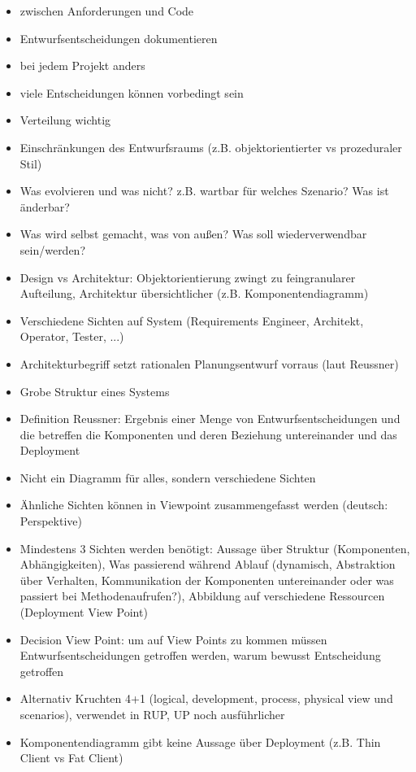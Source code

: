 \documentclass[paper=a4, fontsize=11pt]{scrartcl} %
\numberwithin{equation}{section} %
\numberwithin{figure}{section} %
\numberwithin{table}{section} %
\begin{document}
\begin{itemize}
  \item zwischen Anforderungen und Code
  \item Entwurfsentscheidungen dokumentieren
  \item bei jedem Projekt anders
  \item viele Entscheidungen können vorbedingt sein
  \item Verteilung wichtig
  \item Einschränkungen des Entwurfsraums (z.B. objektorientierter vs prozeduraler Stil)
  \item Was evolvieren und was nicht? z.B. wartbar für welches Szenario? Was ist änderbar?
  \item Was wird selbst gemacht, was von außen? Was soll wiederverwendbar sein/werden?
  \item Design vs Architektur: Objektorientierung zwingt zu feingranularer Aufteilung, Architektur übersichtlicher (z.B. Komponentendiagramm)
  \item Verschiedene Sichten auf System (Requirements Engineer, Architekt, Operator, Tester, ...)
  \item Architekturbegriff setzt rationalen Planungsentwurf vorraus (laut Reussner)
  \item Grobe Struktur eines Systems
  \item Definition Reussner: Ergebnis einer Menge von Entwurfsentscheidungen und die betreffen die Komponenten und deren Beziehung untereinander und das Deployment
  \item Nicht ein Diagramm für alles, sondern verschiedene Sichten
  \item Ähnliche Sichten können in Viewpoint zusammengefasst werden (deutsch: Perspektive)
  \item Mindestens 3 Sichten werden benötigt: Aussage über Struktur (Komponenten, Abhängigkeiten), Was passierend während Ablauf (dynamisch, Abstraktion über Verhalten, Kommunikation der Komponenten untereinander oder was passiert bei Methodenaufrufen?), Abbildung auf verschiedene Ressourcen (Deployment View Point)
  \item Decision View Point: um auf View Points zu kommen müssen Entwurfsentscheidungen getroffen werden, warum bewusst Entscheidung getroffen
  \item Alternativ Kruchten 4+1 (logical, development, process, physical view und scenarios), verwendet in RUP, UP noch ausführlicher
  \item Komponentendiagramm gibt keine Aussage über Deployment (z.B. Thin Client vs Fat Client)

\end{itemize}
\end{document}
